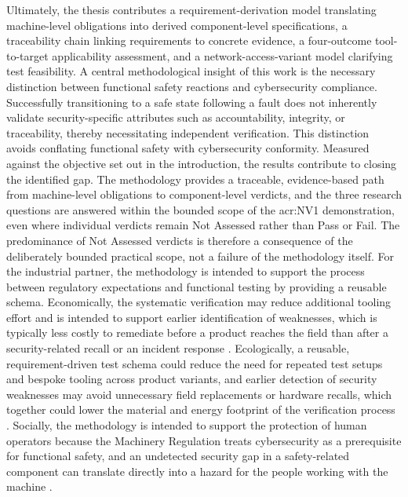 Ultimately, the thesis contributes a requirement-derivation model translating machine-level obligations into derived component-level specifications, a traceability chain linking requirements to concrete evidence, a four-outcome tool-to-target applicability assessment, and a network-access-variant model clarifying test feasibility. A central methodological insight of this work is the necessary distinction between functional safety reactions and cybersecurity compliance. Successfully transitioning to a safe state following a fault does not inherently validate security-specific attributes such as accountability, integrity, or traceability, thereby necessitating independent verification. This distinction avoids conflating functional safety with cybersecurity conformity. Measured against the objective set out in the introduction, the results contribute to closing the identified gap. The methodology provides a traceable, evidence-based path from machine-level obligations to component-level verdicts, and the three research questions are answered within the bounded scope of the \gls{acr:NV1} demonstration, even where individual verdicts remain Not Assessed rather than Pass or Fail. The predominance of Not Assessed verdicts is therefore a consequence of the deliberately bounded practical scope, not a failure of the methodology itself.
For the industrial partner, the methodology is intended to support the process between regulatory expectations and functional testing by providing a reusable schema. Economically, the systematic verification may reduce additional tooling effort and is intended to support earlier identification of weaknesses, which is typically less costly to remediate before a product reaches the field than after a security-related recall or an incident response \cite{nist_software_testing_2002} \Cite[p. 67]{NIST.SP.800-82r3}. Ecologically, a reusable, requirement-driven test schema could reduce the need for repeated test setups and bespoke tooling across product variants, and earlier detection of security weaknesses may avoid unnecessary field replacements or hardware recalls, which together could lower the material and energy footprint of the verification process \Cite{gsf_hardware_efficiency_de}. Socially, the methodology is intended to support the protection of human operators because the Machinery Regulation treats cybersecurity as a prerequisite for functional safety, and an undetected security gap in a safety-related component can translate directly into a hazard for the people working with the machine \cite[p. 4]{EU2023_1230}.


